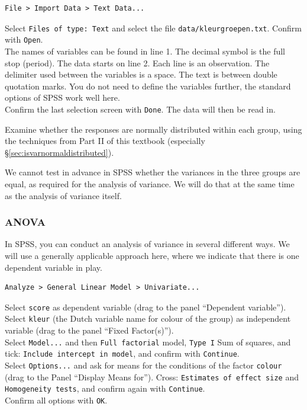 \documentclass[
]{book}
\begin{document}
\begin{verbatim}
File > Import Data > Text Data...
\end{verbatim}

Select \texttt{Files\ of\ type:\ Text} and select the file
\texttt{data/kleurgroepen.txt}. Confirm with \texttt{Open}.\\
The names of variables can be found in line 1. The decimal symbol is
the full stop (period). The data starts on line 2. Each line is an observation.
The delimiter used between the variables is a space. The text is between
double quotation marks. You do not need to define the variables further,
the standard options of SPSS work well here.\\
Confirm the last selection screen with \texttt{Done}. The data will
then be read in.

Examine whether the responses are normally distributed within each group, using the
techniques from Part II of this textbook (especially
§\ref{sec:isvarnormaldistributed}).

We cannot test in advance in SPSS whether the variances in the three groups
are equal, as required for the analysis of variance. We will do that at the same
time as the analysis of variance itself.

\subsubsection{ANOVA}\label{anova}

In SPSS, you can conduct an analysis of variance in several
different ways. We
will use a generally applicable approach here, where we indicate that there
is one dependent variable in play.\\

\begin{verbatim}
Analyze > General Linear Model > Univariate...
\end{verbatim}

Select \texttt{score} as dependent variable (drag to the panel
``Dependent variable'').\\
Select \texttt{kleur} (the Dutch variable name for colour of the group) as independent variable (drag to the panel ``Fixed
Factor(s)'').\\
Select \texttt{Model...} and then \texttt{Full\ factorial} model, \texttt{Type\ I} Sum
of squares, and tick: \texttt{Include\ intercept\ in\ model}, and confirm with
\texttt{Continue}.\\
Select \texttt{Options...} and ask for means for the conditions
of the factor \texttt{colour} (drag to the Panel ``Display Means for''). Cross:
\texttt{Estimates\ of\ effect\ size} and \texttt{Homogeneity\ tests}, and confirm again with
\texttt{Continue}.\\
Confirm all options with \texttt{OK}.
\end{document}
